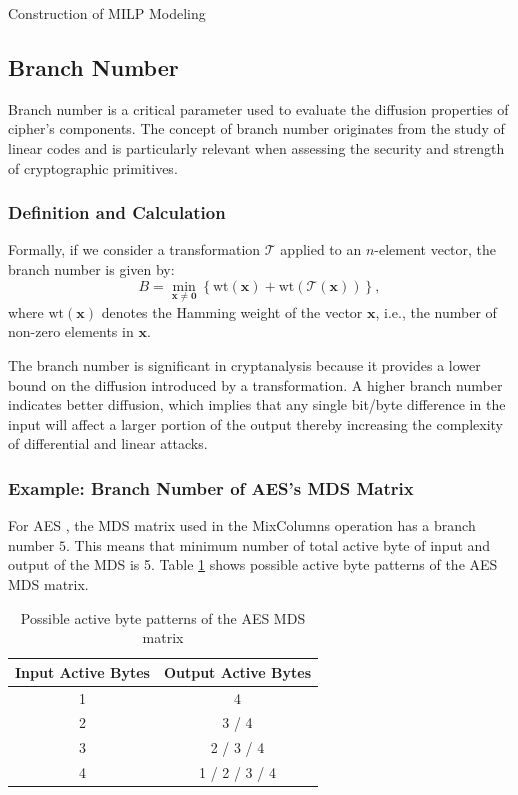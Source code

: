 \begin{section}{Construction of MILP Modeling}

\subsection{Branch Number} \label{sec:branch}
Branch number is a critical parameter used to evaluate the diffusion properties of cipher's components. The concept of branch number originates from the study of linear codes and is particularly relevant when assessing the security and strength of cryptographic primitives.

\subsubsection{Definition and Calculation}

Formally, if we consider a transformation $\mathcal{T}$ applied to an $n$-element vector, the branch number is given by:
$$
B = \min_{\mathbf{x} \neq \mathbf{0}} \left\{ \text{wt}(\mathbf{x}) + \text{wt}(\mathcal{T}(\mathbf{x})) \right\},
$$
where $\text{wt}(\mathbf{x})$ denotes the Hamming weight of the vector $\mathbf{x}$, i.e., the number of non-zero elements in $\mathbf{x}$.

The branch number is significant in cryptanalysis because it provides a lower bound on the diffusion introduced by a transformation. A higher branch number indicates better diffusion, which implies that any single bit/byte difference in the input will affect a larger portion of the output thereby increasing the complexity of differential and linear attacks.

\subsubsection{Example: Branch Number of AES's MDS Matrix}


For AES \cite{dworkin2001advanced}, the MDS matrix used in the MixColumns operation has a branch number $5$. This means that minimum number of total active byte of input and output of the MDS is 5. Table \ref{tab:aes-mds} shows possible active byte patterns of the AES MDS matrix.

\begin{table}[h]
\centering
\begin{tabular}{|c|c|}
\hline
\textbf{Input Active Bytes} & \textbf{Output Active Bytes}           \\ \hline
1                           & 4                                      \\ \hline
2                           & 3 / 4                                   \\ \hline
3                           & 2 / 3 / 4                               \\ \hline
4                           & 1 / 2 / 3 / 4                           \\ \hline
\end{tabular} \\
\caption{Possible active byte patterns of the AES MDS matrix}
\label{tab:aes-mds}
\end{table}


\end{section}
